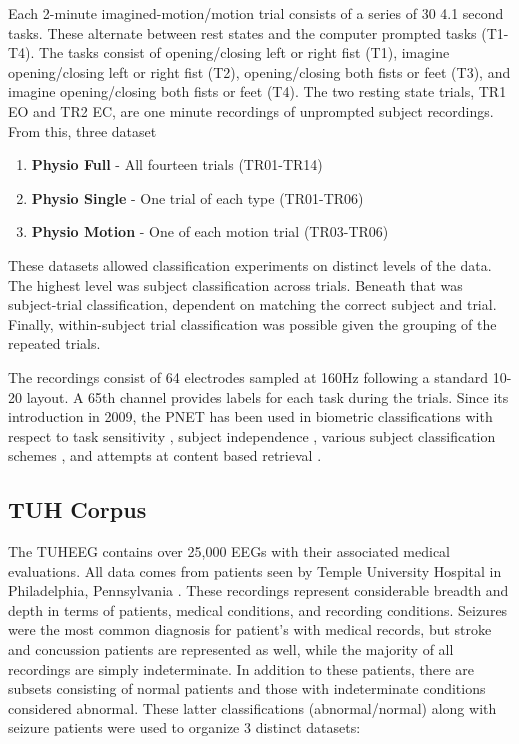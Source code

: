 Each 2-minute imagined-motion/motion trial consists of a series of 30 4.1 second tasks. These alternate between rest states and the computer prompted tasks (T1-T4). The tasks consist of opening/closing left or right fist (T1), imagine opening/closing left or right fist (T2), opening/closing both fists or feet (T3), and imagine opening/closing both fists or feet (T4). The two resting state trials, TR1 \acf{EO} and TR2 \acf{EC}, are one minute recordings of unprompted subject recordings. From this, three dataset 

\begin{enumerate}
\item \textbf{Physio Full} -  All fourteen trials (TR01-TR14)
\item \textbf{Physio Single} - One trial of each type (TR01-TR06)
\item \textbf{Physio Motion} - One of each motion trial (TR03-TR06)
\end{enumerate}

These datasets allowed classification experiments on distinct levels of the data. The highest level was subject classification across trials. Beneath that was subject-trial classification, dependent on matching the correct subject and trial. Finally, within-subject trial classification was possible given the grouping of the repeated trials.

The recordings consist of 64 electrodes sampled at 160Hz following a standard 10-20 layout. A 65th channel provides labels for each task during the trials. Since its introduction in 2009, the \ac{PNET} has been used in biometric classifications \cite{Delpozo-Banos2015} with respect to task sensitivity \cite{Yang2016}, subject independence \cite{Reuderink2011}, various subject classification schemes \cite{Fraschini2015,Rodrigues2016}, and attempts at content based retrieval \cite{Su2013a}.

\subsection{TUH Corpus}

The \acf{TUHEEG} contains over 25,000 \acp{EEG} with their associated medical evaluations. All data comes from patients seen by Temple University Hospital in Philadelphia, Pennsylvania \cite{Obeid2016a}. These recordings represent considerable breadth and depth in terms of patients, medical conditions, and recording conditions. Seizures were the most common diagnosis for patient's with medical records, but stroke and concussion patients are represented as well, while the majority of all recordings are simply indeterminate. In addition to these patients, there are subsets consisting of normal patients and those with indeterminate conditions considered abnormal. These latter classifications (abnormal/normal) along with seizure patients were used to organize 3 distinct datasets:

